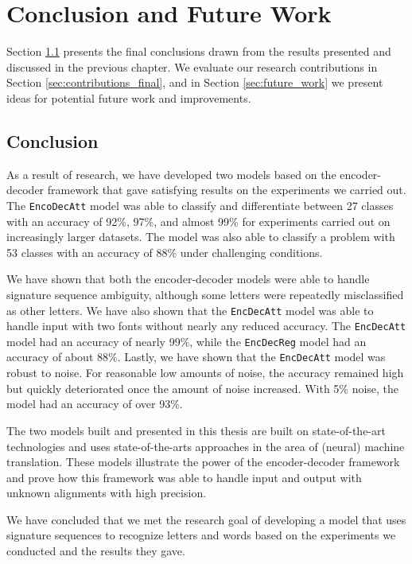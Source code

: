 
\chapter{Conclusion and Future Work}
\label{ch:conclusion}
Section \ref{sec:conclusion} presents the final conclusions drawn from the results presented and discussed in the previous chapter. We evaluate our research contributions in Section \ref{sec:contributions_final}, and in Section \ref{sec:future_work} we present ideas for potential future work and improvements.

\section{Conclusion}
\label{sec:conclusion}
As a result of research, we have developed two models based on the encoder-decoder framework that gave satisfying results on the experiments we carried out. The {\tt EncoDecAtt} model was able to classify and differentiate between 27 classes with an accuracy of 92\%, 97\%, and almost 99\% for experiments carried out on increasingly larger datasets. The model was also able to classify a problem with 53 classes with an accuracy of 88\% under challenging conditions.

We have shown that both the encoder-decoder models were able to handle signature sequence ambiguity, although some letters were repeatedly misclassified as other letters. We have also shown that the {\tt EncDecAtt} model was able to handle input with two fonts without nearly any reduced accuracy. The {\tt EncDecAtt} model had an accuracy of nearly 99\%, while the {\tt EncDecReg} model had an accuracy of about 88\%. Lastly, we have shown that the {\tt EncDecAtt} model was robust to noise. For reasonable low amounts of noise, the accuracy remained high but quickly deteriorated once the amount of noise increased. With 5\% noise, the model had an accuracy of over 93\%.

The two models built and presented in this thesis are built on state-of-the-art technologies and uses state-of-the-arts approaches in the area of (neural) machine translation. These models illustrate the power of the encoder-decoder framework and prove how this framework was able to handle input and output with unknown alignments with high precision.

We have concluded that we met the research goal of developing a model that uses signature sequences to recognize letters and words based on the experiments we conducted and the results they gave.

